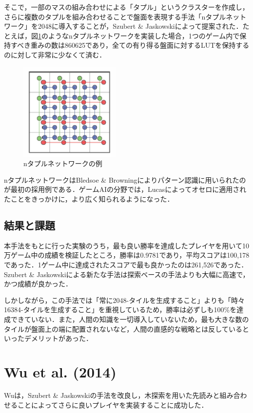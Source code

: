 \documentclass{suribt}
\begin{document}
そこで，一部のマスの組み合わせによる「タプル」というクラスターを作成し，さらに複数のタプルを組み合わせることで盤面を表現する手法「nタプルネットワーク」を2048に導入することが，Szubert \& Jaskowskiによって提案された．たとえば，図\ref{figure_001}のようなnタプルネットワークを実装した場合，1つのゲーム内で保持すべき重みの数は860625であり，全ての有り得る盤面に対するLUTを保持するのに対して非常に少なくて済む．

\begin{figure}[t]
	\begin{center}
	\includegraphics[width=5cm]{figure_001.png}
	\caption{nタプルネットワークの例}
	\label{figure_001}
	\end{center}
\end{figure}

nタプルネットワークはBledsoe \& Browningによりパターン認識に用いられたのが最初の採用例である\cite{Bledsoe}．ゲームAIの分野では，Lucasによってオセロに適用されたことをきっかけに，より広く知られるようになった\cite{Lucas}．

\subsection{結果と課題}
本手法をもとに行った実験のうち，最も良い勝率を達成したプレイヤを用いて10万ゲーム中の成績を検証したところ，勝率は0.9781であり，平均スコアは100,178であった．1ゲーム中に達成されたスコアで最も良かったのは261,526であった．Szubert \& Jaskowskiによる新たな手法は探索ベースの手法よりも大幅に高速で，かつ成績が良かった\cite{Szubert}．

しかしながら，この手法では「常に2048-タイルを生成すること」よりも「時々16384-タイルを生成すること」を重視しているため，勝率は必ずしも100\%を達成できていない．また，人間の知識を一切導入していないため，最も大きな数のタイルが盤面上の端に配置されないなど，人間の直感的な戦略とは反しているといったデメリットがあった．

\section{Wu et al. (2014)}
Wuは，Szubert \& Jaskowskiの手法を改良し，木探索を用いた先読みと組み合わせることによってさらに良いプレイヤを実装することに成功した．
\end{document}
